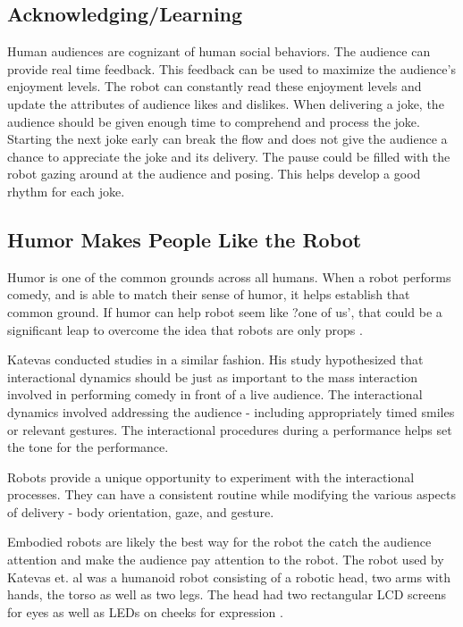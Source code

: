\documentclass[onecolumn, draftclsnofoot,10pt, compsoc]{IEEEtran}
\begin{document}
\subsection{Acknowledging/Learning}
Human audiences are cognizant of human social behaviors. The audience can provide real time feedback. This feedback can be used to maximize the audience's enjoyment levels. The robot can constantly read these enjoyment levels and update the attributes of audience likes and dislikes. When delivering a joke, the audience should be given enough time to comprehend and process the joke. Starting the next joke early can break the flow and does not give the audience a chance to appreciate the joke and its delivery. The pause could be filled with the robot gazing around at the audience and posing. This helps develop a good rhythm for each joke.

\subsection{Humor Makes People Like the Robot }
Humor is one of the common grounds across all humans. When a robot performs comedy, and is able to match their sense of humor, it helps establish that common ground. If humor can help robot seem like ?one of us', that could be a significant leap to overcome the idea that robots are only props \cite{KnightEightLessons:2011}.


Katevas conducted studies in a similar fashion. His study hypothesized that interactional dynamics should be just as important to the mass interaction involved in performing comedy in front of a live audience. The interactional dynamics involved addressing the audience - including appropriately timed smiles or relevant gestures. The interactional procedures during a performance helps set the tone for the performance. 

Robots provide a unique opportunity to experiment with the interactional processes. They can have a consistent routine while modifying the various aspects of delivery - body orientation, gaze, and gesture. 

Embodied robots are likely the best way for the robot the catch the audience attention and make the audience pay attention to the robot. The robot used by Katevas et. al was a humanoid robot consisting of a robotic head, two arms with hands, the torso as well as two legs. The head had two rectangular LCD screens for eyes as well as LEDs on cheeks for expression \cite{RobotComedyLab:2015}.	
\end{document}
